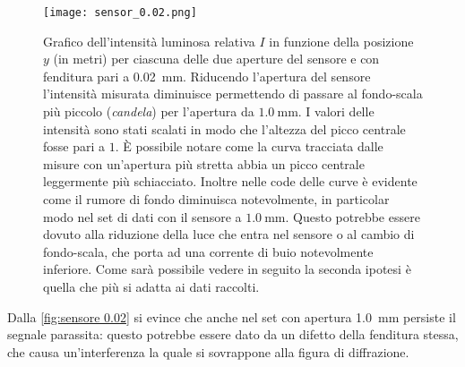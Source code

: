 \documentclass[../main.tex]{subfiles}
\begin{document}
\begin{figure}[ht!]
    \centering
    \texttt{[image: sensor\_0.02.png]}
    \caption{Grafico dell'intensità luminosa relativa $I$ in funzione della posizione $y$ (in metri) per ciascuna delle due aperture del sensore e con fenditura pari a \qty{0.02}{\mm}.
        Riducendo l'apertura del sensore l'intensità misurata diminuisce permettendo di passare al fondo-scala più piccolo (\textit{candela}) per l'apertura da $\qty{1.0}{\mm}$.
        I valori delle intensità sono stati scalati in modo che l'altezza del picco centrale fosse pari a $1$. È possibile notare come la curva tracciata dalle misure con un'apertura più stretta abbia un picco centrale leggermente più schiacciato.
        Inoltre nelle code delle curve è evidente come il rumore di fondo diminuisca notevolmente, in particolar modo nel set di dati con il sensore a $\qty{1.0}{\mm}$. Questo potrebbe essere dovuto alla riduzione della luce che entra nel sensore o al cambio di fondo-scala, che porta ad una corrente di buio notevolmente inferiore. %
        Come sarà possibile vedere in seguito la seconda ipotesi è quella che più si adatta ai dati raccolti.} %
    \label{fig:sensore 0.02}
\end{figure}

Dalla \autoref{fig:sensore 0.02} si evince che anche nel set con apertura \qty{1.0}{\mm} persiste il segnale parassita: questo potrebbe essere dato da un difetto della fenditura stessa, che causa un'interferenza la quale si sovrappone alla figura di diffrazione.
\end{document}
